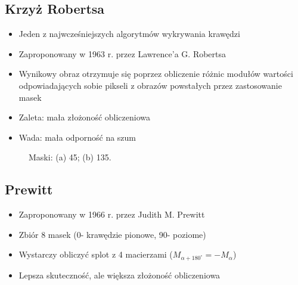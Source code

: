 \documentclass[a4paper,twocolumn,12pt]{article}
\begin{document}
\subsection{Krzyż Robertsa}

\begin{itemize}
 \item Jeden z najwcześniejszych algorytmów wykrywania krawędzi
 \item Zaproponowany w 1963 r. przez Lawrence’a G. Robertsa
 \item Wynikowy obraz otrzymuje się poprzez obliczenie różnic modułów wartości odpowiadających sobie pikseli z obrazów powstałych przez zastosowanie masek
 \item Zaleta: mała złożoność obliczeniowa
 \item Wada: mała odporność na szum
\end{itemize}

\begin{figure}[!ht]
 \begin{center}
 \end{center}
 \caption{
  Maski:
  (a) 45\textdegree;
  (b) 135\textdegree.
 }
 \label{fig:roberts_matrices}
\end{figure}


\subsection{Prewitt}

\begin{itemize}
 \item Zaproponowany w 1966 r. przez Judith M. Prewitt
 \item Zbiór 8 masek (0\textdegree - krawędzie pionowe, 90\textdegree - poziome)
 \item Wystarczy obliczyć splot z 4 macierzami ($M_{\alpha+180^\circ} = -M_\alpha$)
 \item Lepsza skuteczność, ale większa złożoność obliczeniowa
\end{itemize}
\end{document}
